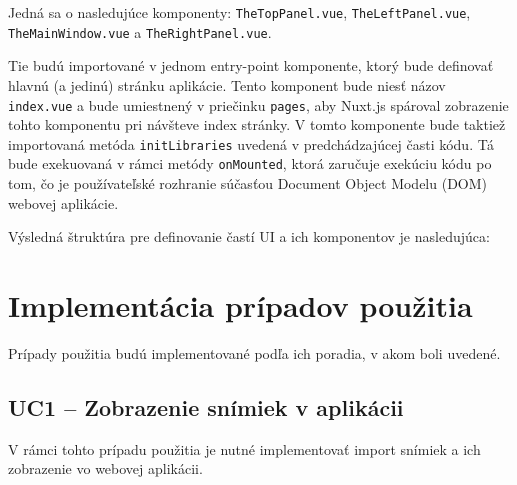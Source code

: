 Jedná sa o nasledujúce komponenty: \texttt{TheTopPanel.vue}, \texttt{TheLeftPanel.vue}, \texttt{TheMainWindow.vue} a \texttt{TheRightPanel.vue}.

Tie budú importované v jednom entry-point komponente, ktorý bude definovať hlavnú (a jedinú) stránku aplikácie. Tento komponent bude niesť názov \texttt{index.vue} a bude umiestnený v priečinku \texttt{pages}, aby Nuxt.js spároval zobrazenie tohto komponentu pri návšteve index stránky. V tomto komponente bude taktiež importovaná metóda \texttt{initLibraries} uvedená v predchádzajúcej časti kódu. Tá bude exekuovaná v rámci metódy \texttt{onMounted}, ktorá zaručuje exekúciu kódu po tom, čo je používateľské rozhranie súčasťou Document Object Modelu (DOM) webovej aplikácie.

\clearpage

Výsledná štruktúra pre definovanie častí UI a ich komponentov je nasledujúca:
\begin{figure}[H]
\end{figure}

\section{Implementácia prípadov použitia}
Prípady použitia budú implementované podľa ich poradia, v akom boli uvedené.

\subsection {UC1 -- Zobrazenie snímiek v aplikácii}
V rámci tohto prípadu použitia je nutné implementovať import snímiek a ich zobrazenie vo webovej aplikácii.

